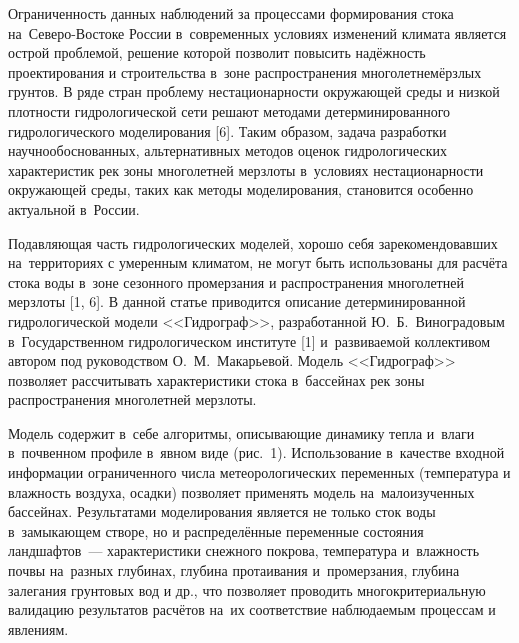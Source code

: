  

\makeProcTitle
{}

Ограниченность данных наблюдений за процессами формирования стока на~Северо-Востоке России в~современных условиях изменений климата является острой проблемой, решение которой позволит повысить надёжность проектирования и строительства в~зоне распространения многолетнемёрзлых грунтов. В ряде стран проблему нестационарности окружающей среды и низкой плотности гидрологической сети решают методами детерминированного гидрологического моделирования [6]. Таким образом, задача разработки научнообоснованных, альтернативных методов оценок гидрологических характеристик рек зоны многолетней мерзлоты в~условиях нестационарности окружающей среды, таких как методы моделирования, становится особенно актуальной в~России.

Подавляющая часть гидрологических моделей, хорошо себя зарекомендовавших на~территориях с умеренным климатом, не могут быть использованы для расчёта стока воды в~зоне сезонного промерзания и распространения многолетней мерзлоты [1, 6]. В данной статье приводится описание детерминированной гидрологической модели <<Гидрограф>>, разработанной Ю.~Б.~Виноградовым в~Государственном гидрологическом институте [1] и~развиваемой коллективом автором под руководством О.~М.~Макарьевой. Модель <<Гидрограф>> позволяет рассчитывать характеристики стока в~бассейнах рек зоны распространения многолетней мерзлоты.

Модель содержит в~себе алгоритмы, описывающие динамику тепла и~влаги в~почвенном профиле в~явном виде (рис.~1). Использование в~качестве входной информации ограниченного числа метеорологических переменных (температура и влажность воздуха, осадки) позволяет применять модель на~малоизученных бассейнах. Результатами моделирования является не только сток воды в~замыкающем створе, но и распределённые переменные состояния ландшафтов~--- характеристики снежного покрова, температура и~влажность почвы на~разных глубинах, глубина протаивания и~промерзания, глубина залегания грунтовых вод и др., что позволяет проводить многокритериальную валидацию результатов расчётов на~их соответствие наблюдаемым процессам и явлениям.


